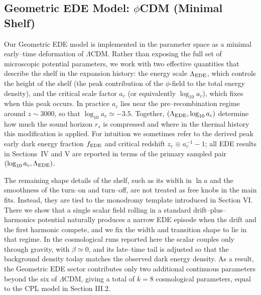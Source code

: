 \documentclass[a4paper,11pt]{article}
\begin{document}
\subsection{Geometric EDE Model: $\phi$CDM (Minimal Shelf)}
\label{sec:ede}

Our Geometric EDE model is implemented in the parameter space as a minimal early--time deformation of $\Lambda$CDM. Rather than exposing the full set of microscopic potential parameters, we work with two effective quantities that describe the shelf in the expansion history: the energy scale $\Lambda_{\rm EDE}$, which controls the height of the shelf (the peak contribution of the $\phi$-field to the total energy density), and the critical scale factor $a_c$ (or equivalently $\log_{10}a_c$), which fixes when this peak occurs. In practice $a_c$ lies near the pre--recombination regime around $z \sim 3000$, so that $\log_{10}a_c \simeq -3.5$. Together, $(\Lambda_{\rm EDE}, \log_{10}a_c)$ determine how much the sound horizon $r_s$ is compressed and where in the thermal history this modification is applied. For intuition we sometimes refer to the derived peak early dark energy fraction $f_{\rm EDE}$ and critical redshift $z_c \equiv a_c^{-1} - 1$; all EDE results in Sections~IV and V are reported in terms of the primary sampled pair $(\log_{10}a_c, \Lambda_{\rm EDE})$.

The remaining shape details of the shelf, such as its width in $\ln a$ and the smoothness of the turn--on and turn--off, are not treated as free knobs in the main fits. Instead, they are tied to the monodromy template introduced in Section VI. There we show that a single scalar field rolling in a standard drift--plus--harmonics potential naturally produces a narrow EDE episode when the drift and the first harmonic compete, and we fix the width and transition shape to lie in that regime. In the cosmological runs reported here the scalar couples only through gravity, with $\beta \simeq 0$, and its late--time tail is adjusted so that the background density today matches the observed dark energy density. As a result, the Geometric EDE sector contributes only two additional continuous parameters beyond the six of $\Lambda$CDM, giving a total of $k = 8$ cosmological parameters, equal to the CPL model in Section III.2.
\end{document}
